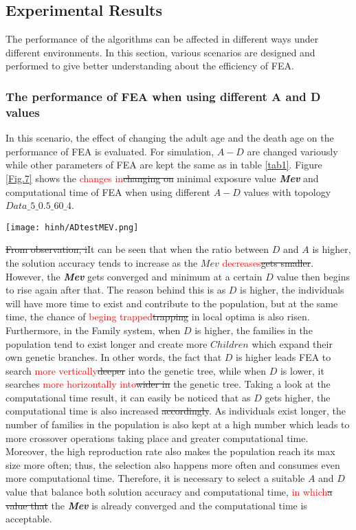 \documentclass[final]{elsarticle}
\begin{document}
\subsection{Experimental Results}
The performance of the algorithms can be affected in different ways under different environments. In this section, various scenarios are designed and performed to give better understanding about the efficiency of FEA.
\subsubsection{The performance of FEA when using different A and D values}
In this scenario, the effect of changing the adult age and the death age on the performance of FEA is evaluated. For simulation, $A - D$ are changed variously while other parameters of FEA are kept the same as in table \ref{tab1}. Figure \ref{Fig.7} shows the \textcolor{red}{changes in}\sout{changing on} minimal exposure value \textit{\textbf{Mev}} and computational time of FEA when using different $A-D$ values with topology $Data\_5\_0.5\_60\_4$.
\begin{figure*}[h]
	\texttt{[image: hinh/ADtestMEV.png]}
	\centering
	\caption{The minimal exposure value when using different A-D values
	}
	\label{Fig.7}       %
\end{figure*}

\sout{From observation, i}It can be seen that when the ratio between $D$ and $A$ is higher, the solution accuracy tends to increase as the $Mev$ \textcolor{red}{decreases}\sout{gets smaller}. However, the \textit{\textbf{Mev}} gets converged and minimum at a certain $D$ value then begins to rise again after that. The reason behind this is as $D$ is higher, the individuals will have more time to exist and contribute to the population, but at the same time, the chance of \textcolor{red}{beging trapped}\sout{trapping} in local optima is also risen. Furthermore, in the Family system, when $D$ is higher, the families in the population tend to exist longer and create more $Children $ which expand their own genetic branches. In other words, the fact that $D$ is higher leads FEA to search \textcolor{red}{more vertically}\sout{deeper} into the genetic tree, while when $D$ is lower, it searches \textcolor{red}{more horizontally into}\sout{wider in} the genetic tree. Taking a look at the computational time result, it can easily be noticed that as $D$ gets higher, the computational time is also increased \sout{accordingly}. As individuals exist longer, the number of families in the population is also kept at a high number which leads to more crossover operations taking place and greater computational time. Moreover, the high reproduction rate also makes the population reach its max size more often; thus, the selection also happens more often and consumes even more computational time. Therefore, it is necessary to select a suitable $A$ and $D$ value that balance both solution accuracy and computational time, \textcolor{red}{in which}\sout{a value that} the \textbf{\textit{Mev}} is already converged and the computational time is acceptable.  
\end{document}
